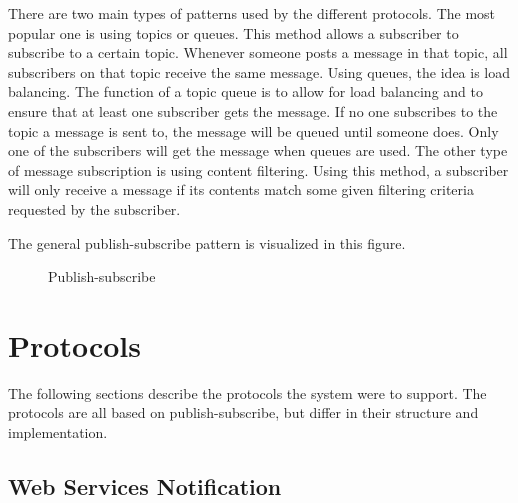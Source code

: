 There are two main types of patterns used by the different protocols. The most popular one is using topics or queues. This method allows a subscriber to subscribe to a certain topic. Whenever someone posts a message in that topic, all subscribers on that topic receive the same message. Using queues, the idea is load balancing. The function of a topic queue is to allow for load balancing and to ensure that at least one subscriber gets the message. If no one subscribes to the topic a message is sent to, the message will be queued until someone does. Only one of the subscribers will get the message when queues are used. The other type of message subscription is using content filtering. Using this method, a subscriber will only receive a message if its contents match some given filtering criteria requested by the subscriber.

The general publish-subscribe pattern is visualized in this figure.

\begin{center}
  \begin{figure}[ht]
    \caption{Publish-subscribe}
    \label{fig:publish-subscribe}
  \end{figure}
\end{center}

\section{Protocols}
\label{prestudies-protocols}

The following sections describe the protocols the system were to support. The protocols are all based on publish-subscribe, but differ in their structure and implementation.

\subsection{Web Services Notification}
\label{subsec:prestudies-wsnotification}

